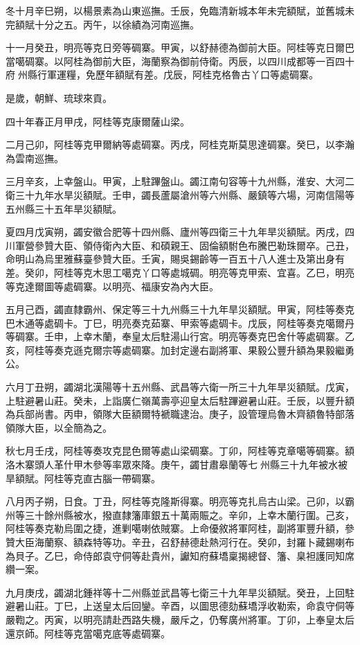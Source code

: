 \begin{pinyinscope}
冬十月辛巳朔，以楊景素為山東巡撫。壬辰，免臨清新城本年未完額賦，並舊城未完額賦十分之五。丙午，以徐績為河南巡撫。

十一月癸丑，明亮等克日旁等碉寨。甲寅，以舒赫德為御前大臣。阿桂等克日爾巴當噶碉寨。以阿桂為御前大臣，海蘭察為御前侍衛。丙辰，以四川成都等一百四十府州縣行軍運糧，免歷年額賦有差。戊辰，阿桂克格魯古丫口等處碉寨。

是歲，朝鮮、琉球來貢。

四十年春正月甲戌，阿桂等克康爾薩山梁。

二月己卯，阿桂等克甲爾納等處碉寨。丙戌，阿桂克斯莫思達碉寨。癸巳，以李瀚為雲南巡撫。

三月辛亥，上幸盤山。甲寅，上駐蹕盤山。蠲江南句容等十九州縣，淮安、大河二衛三十九年水旱災額賦。壬申，蠲長蘆屬滄州等六州縣、嚴鎮等六場，河南信陽等五州縣三十五年旱災額賦。

夏四月戊寅朔，蠲安徽合肥等十四州縣、廬州等四衛三十九年旱災額賦。丙戌，四川軍營參贊大臣、領侍衛內大臣、和碩親王、固倫額駙色布騰巴勒珠爾卒。己丑，命明山為烏里雅蘇臺參贊大臣。壬寅，賜吳錫齡等一百五十八人進士及第出身有差。癸卯，阿桂等克木思工噶克丫口等處城碉。明亮等克甲索、宜喜。乙巳，明亮等克達爾圖等處碉寨。以明亮、福康安為內大臣。

五月己酉，蠲直隸霸州、保定等三十九州縣三十九年旱災額賦。甲寅，阿桂等奏克巴木通等處碉卡。丁巳，明亮奏克茹寨、甲索等處碉卡。戊辰，阿桂等奏克噶爾丹等碉寨。壬申，上幸木蘭，奉皇太后駐湯山行宮。明亮等奏克巴舍什等處碉寨。乙亥，阿桂等奏克遜克爾宗等處碉寨。加封定邊右副將軍、果毅公豐升額為果毅繼勇公。

六月丁丑朔，蠲湖北漢陽等十五州縣、武昌等六衛一所三十九年旱災額賦。戊寅，上駐避暑山莊。癸未，上詣廣仁嶺萬壽亭迎皇太后駐蹕避暑山莊。壬辰，以豐升額為兵部尚書。丙申，領隊大臣額爾特褫職逮治。庚子，設管理烏魯木齊額魯特部落領隊大臣，以全簡為之。

秋七月壬戌，阿桂等奏攻克昆色爾等處山梁碉寨。丁卯，阿桂等克章噶等碉寨。額洛木寨頭人革什甲木參等率眾來降。庚午，蠲甘肅皋蘭等七州縣三十九年被水被旱額賦。阿桂等克直古腦一帶碉寨。

八月丙子朔，日食。丁丑，阿桂等克隆斯得寨。明亮等克扎烏古山梁。己卯，以霸州等三十餘州縣被水，撥直隸籓庫銀五十萬兩賑之。辛卯，上幸木蘭行圍。己亥，阿桂等奏克勒烏圍之捷，進剿噶喇依賊寨。上命優敘將軍阿桂，副將軍豐升額，參贊大臣海蘭察、額森特等功。辛丑，召舒赫德赴熱河行在。癸卯，封羅卜藏錫喇布為貝子。乙巳，命侍郎袁守侗等赴貴州，讞知府蘇墧稟揭總督、籓、臬袒護同知席纘一案。

九月庚戌，蠲湖北鍾祥等十二州縣並武昌等七衛三十九年旱災額賦。癸丑，上回駐避暑山莊。丁巳，上送皇太后回鑾。辛酉，以圖思德劾蘇墧浮收勒索，命袁守侗等嚴鞫之。丙寅，以明亮請赴西路失機，嚴斥之，仍奪廣州將軍。丁卯，上奉皇太后還京師。阿桂等克當噶克底等處碉寨。


\end{pinyinscope}
